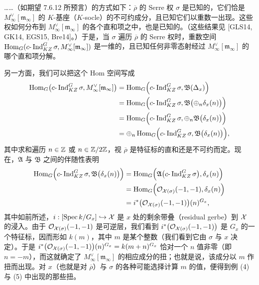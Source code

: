 
……（如期望 7.6.12 所预言）的方式如下：$\overline{\rho}$ 的 Serre 权 $\sigma$ 是已知的，它们恰是 $M^\vee_\infty[\mathfrak m_\infty]$ 的 $K$-基座（$K$-socle）的不可约成分，且已知它们以重数一出现。这些权如何分布到 $M^\vee_\infty[\mathfrak m_\infty]$ 的各个直和项之中，也是已知的。（这些结果见 [GLS14, GK14, EGS15, Bre14]。）于是，当 $\sigma$ 遍历 $\overline{\rho}$ 的 Serre 权时，重数空间 $\operatorname{Hom}_G(c\text{-}\operatorname{Ind}_{KZ}^G\sigma,M^\vee_\infty[\mathfrak m_\infty])$ 是一维的，且已知任何非零态射经过 $M^\vee_\infty[\mathfrak m_\infty]$ 的哪个直和项分解。

另一方面，我们可以把这个 Hom 空间写成
\[
\begin{aligned}
\operatorname{Hom}_G\bigl(c\text{-}\operatorname{Ind}_{KZ}^G\sigma,M^\vee_\infty[\mathfrak m_\infty]\bigr)
&=\operatorname{Hom}_G\Bigl(c\text{-}\operatorname{Ind}_{KZ}^G\sigma,\mathfrak B(\Delta_x)\Bigr)\\
&=\operatorname{Hom}_G\Bigl(c\text{-}\operatorname{Ind}_{KZ}^G\sigma,\mathfrak B\bigl(\oplus_n\delta_x(n)\bigr)\Bigr)\\
&=\operatorname{Hom}_G\Bigl(c\text{-}\operatorname{Ind}_{KZ}^G\sigma,\oplus_n\mathfrak B\bigl(\delta_x(n)\bigr)\Bigr)\\
&=\oplus_n\operatorname{Hom}_G\Bigl(c\text{-}\operatorname{Ind}_{KZ}^G\sigma,\mathfrak B\bigl(\delta_x(n)\bigr)\Bigr),
\end{aligned}
\]
其中求和遍历 $n\in\mathbb{Z}$ 或 $n\in\mathbb{Z}/2\mathbb{Z}$，视 $\overline{\rho}$ 是特征标的直和还是不可约而定。现在，$\mathfrak A$ 与 $\mathfrak B$ 之间的伴随性表明
\[
\begin{aligned}
\operatorname{Hom}_G\Bigl(c\text{-}\operatorname{Ind}_{KZ}^G\sigma,\mathfrak B\bigl(\delta_x(n)\bigr)\Bigr)
&=\operatorname{Hom}_G\Bigl(\mathfrak A\bigl(c\text{-}\operatorname{Ind}_{KZ}^G\sigma\bigr),\delta_x(n)\Bigr)\\
&=\operatorname{Hom}_G\Bigl(\mathcal{O}_{\mathcal{X}(\sigma)}(-1,-1),\delta_x(n)\Bigr)\\
&=i^*\bigl(\mathcal{O}_{\mathcal{X}(\sigma)}(-1,-1)\bigr)(n)^{G_x},
\end{aligned}
\]
其中如前所述，$i:[\operatorname{Spec} k/G_x]\hookrightarrow\mathcal{X}$ 是 $x$ 处的剩余带叠（residual gerbe）到 $\mathcal{X}$ 的浸入。由于 $\mathcal{O}_{\mathcal{X}(\sigma)}(-1,-1)$ 是可逆层，我们看到 $i^*\bigl(\mathcal{O}_{\mathcal{X}(\sigma)}(-1,-1)\bigr)$ 是 $G_x$ 的一个特征标，因而形如 $k(m)$，其中 $m$ 是某个整数（我们看到它由 $\sigma$ 与 $x$ 决定）。于是 $i^*\bigl(\mathcal{O}_{\mathcal{X}(\sigma)}(-1,-1)\bigr)(n)^{G_x}=k(m+n)^{G_x}$ 恰对一个 $n$ 值非零（即 $n=-m$），而这就确定了 $M^\vee_\infty[\mathfrak m_\infty]$ 的相应成分的扭；也就是说，该成分以 $m$ 作扭而出现。对 $x$（也就是对 $\overline{\rho}$）与 $\sigma$ 的各种可能选择计算 $m$ 的值，便得到例 (4) 与 (5) 中出现的那些扭。

